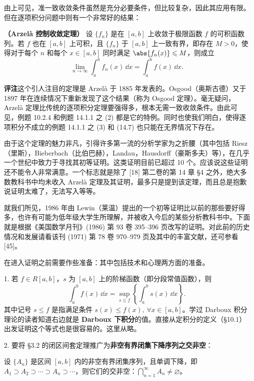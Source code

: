 由上可见，准一致收敛条件虽然是充分必要条件，但比较复杂，因此其应用有限。但在逐项积分问题中则有一个非常好的结果：

\begin{xproposition}[14.2.4]
\textbf{（Arzelà 控制收敛定理）} 设 $\{f_n\}$ 是在 $[a,b]$ 上收敛于极限函数 $f$ 的可积函数列。若 $f$ 也在 $[a,b]$ 上可积，且 $\{f_n\}$ 于 $[a,b]$ 上一致有界，即存在 $M>0$，使得对于每个 $n$ 和每个 $x\in[a,b]$ 同时满足 $\abs{f_n(x)}\leqslant M$，则成立
\[
  \lim_{n\to\infty}\int_a^b f_n(x)\,\dd x=\int_a^b f(x)\,\dd x.
\]
\end{xproposition}

\textbf{评注}\quad 这个引人注目的定理是 Arzelà 于 1885 年发表的。Osgood（奥斯古德）又于 1897 年在连续情况下重新发现了这个结果（称为 Osgood 定理）。毫无疑问，Arzelà 定理比传统的逐项积分定理要强得多，根本无需一致收敛条件。由此可见，例题 10.2.4 和例题 14.1.1 之 (2) 都是它的特例。同时也使我们明白，使得逐项积分不成立的例题 14.1.1 之 (3) 和 (14.7) 也只能在无界情况下存在。

由于这个定理的魅力非凡，引得许多第一流的分析学家为之折腰（其中包括 Riesz（里斯），Bieberbach（比伯巴赫），Landau，Hausdorff（豪斯多夫）等），在几乎一个世纪中致力于寻找其初等证明。这类证明目前已超过 10 个。应该说这些证明还不能令人非常满意。一个标志就是除了 [18] 第二卷的第 14 章 §4 之外，绝大多数教科书中均未收入 Arzelà 定理及其证明，最多只是提到该定理，而且总是抱歉说证明太难了，无法写入等等。

就我们所见，1986 年由 Lewin（莱温）提出的一个初等证明比以前的那些要好得多，也许有可能为低年级大学生所理解，并被收入今后的某些分析教科书中。下面就是根据《美国数学月刊》(1986) 第 93 卷 395--396 页改写的证明。对此前的历史情况和发展请看该刊 (1971) 第 78 卷 970--979 页及其中的丰富文献，还可参看 [45]。

在进入证明之前需要作些准备：其中包括技术和心理两方面的准备。

1. 若 $f\in R[a,b]$，$s$ 为 $[a,b]$ 上的阶梯函数（即分段常值函数），则
\begin{equation}
  \int_a^b f(x)\,\dd x=\sup_{s\leqslant f}\left\{\int_a^b s(x)\,\dd x\right\}.
  \tag{14.9}
  \label{eq:14.9}
\end{equation}
其中记号 $s\leqslant f$ 是指满足条件 $s(x)\leqslant f(x),\ \forall x\in[a,b]$。学过 Darboux 积分理论的读者知道右边就是 \textbf{Darboux 下积分}的值。直接从定积分的定义（§10.1）出发证明这个等式也是很容易的。这里从略。

2. 要将 §3.2 的闭区间套定理推广为\textbf{非空有界闭集下降序列之交非空}：

\begin{xtheorem}
设 $\{A_n\}$ 是区间 $[a,b]$ 内的非空有界闭集序列，且单调下降，即 $A_1\supset A_2\supset\cdots\supset A_n\supset\cdots$，则它们的交非空：$\displaystyle\bigcap_{n=1}^{\infty}A_n\ne\varnothing$。
\end{xtheorem}


